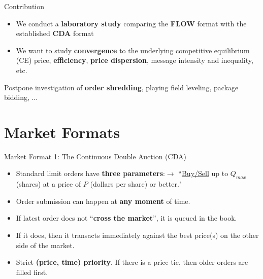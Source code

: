 \documentclass[10pt]{beamer}
\begin{document}
\begin{frame}{Contribution}
    \begin{itemize}
        \item We conduct a \textbf{laboratory study} comparing the \textbf{FLOW} format with the established \textbf{CDA} format
        \item We want to study \textbf{convergence} to the underlying competitive equilibrium (CE) price, \textbf{efficiency}, \textbf{price dispersion}, message intensity and inequality, etc. 
    \end{itemize}
    Postpone investigation of \textbf{order shredding}, playing field leveling, package bidding, ...
\end{frame}

\section{Market Formats}
\begin{frame}{Market Format 1: The Continuous Double Auction (CDA)}
    \begin{itemize}
        \item Standard limit orders have \textbf{three parameters}:$\rightarrow$ ``\underline{Buy/Sell} up to \underline{$Q_{max}$} (shares) at a price of \underline{$P$} (dollars per share) or better."
        \item Order submission can happen at \textbf{any moment} of time. 
        \item If latest order does not ``\textbf{cross the market}'', it is queued in the book. 
        \item If it does, then it transacts immediately against the best price(s) on the other side of the market.
        \item Strict \textbf{(price, time) priority}. If there is a price tie, then older orders are filled first.
    \end{itemize} 
\end{frame}
\end{document}
